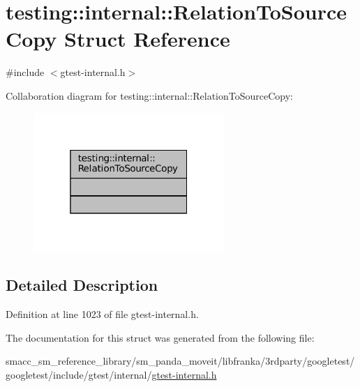 \hypertarget{structtesting_1_1internal_1_1RelationToSourceCopy}{}\section{testing\+:\+:internal\+:\+:Relation\+To\+Source\+Copy Struct Reference}
\label{structtesting_1_1internal_1_1RelationToSourceCopy}


{\ttfamily \#include $<$gtest-\/internal.\+h$>$}



Collaboration diagram for testing\+:\+:internal\+:\+:Relation\+To\+Source\+Copy\+:
\nopagebreak
\begin{figure}[H]
\begin{center}
\leavevmode
\includegraphics[width=205pt]{structtesting_1_1internal_1_1RelationToSourceCopy__coll__graph}
\end{center}
\end{figure}


\subsection{Detailed Description}


Definition at line 1023 of file gtest-\/internal.\+h.



The documentation for this struct was generated from the following file\+:\begin{DoxyCompactItemize}
\item 
smacc\+\_\+sm\+\_\+reference\+\_\+library/sm\+\_\+panda\+\_\+moveit/libfranka/3rdparty/googletest/googletest/include/gtest/internal/\hyperlink{gtest-internal_8h}{gtest-\/internal.\+h}\end{DoxyCompactItemize}
